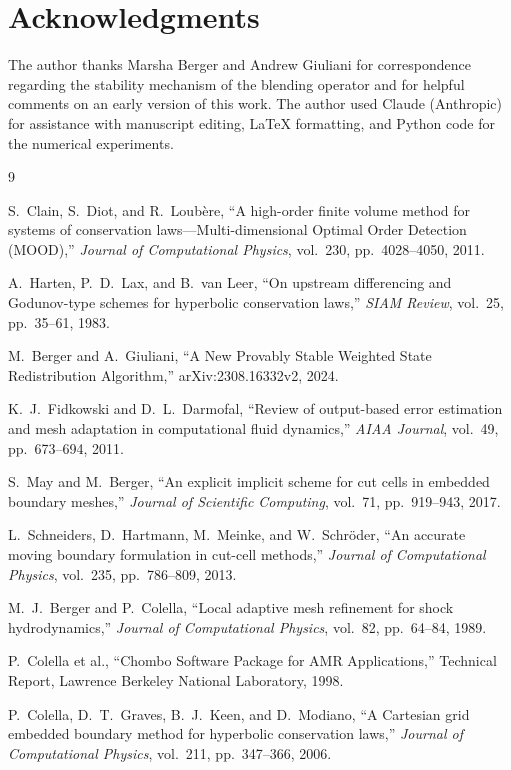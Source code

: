 \documentclass[11pt]{article}
\begin{document}
\section*{Acknowledgments}

The author thanks Marsha Berger and Andrew Giuliani for correspondence
regarding the stability mechanism of the blending operator and for
helpful comments on an early version of this work. The author used Claude (Anthropic) for assistance with manuscript 
editing, LaTeX formatting, and Python code for the numerical experiments.

\begin{thebibliography}{9}

S.~Clain, S.~Diot, and R.~Loub\`ere,
``A high-order finite volume method for systems of conservation laws---Multi-dimensional Optimal Order Detection (MOOD),''
\emph{Journal of Computational Physics}, vol.~230, pp.~4028--4050, 2011.

A.~Harten, P.~D.~Lax, and B.~van Leer,
``On upstream differencing and Godunov-type schemes for hyperbolic conservation laws,''
\emph{SIAM Review}, vol.~25, pp.~35--61, 1983.

M.~Berger and A.~Giuliani,
``A New Provably Stable Weighted State Redistribution Algorithm,''
arXiv:2308.16332v2, 2024.

K.~J.~Fidkowski and D.~L.~Darmofal,
``Review of output-based error estimation and mesh adaptation in computational 
fluid dynamics,''
\emph{AIAA Journal}, vol.~49, pp.~673--694, 2011.

S.~May and M.~Berger,
``An explicit implicit scheme for cut cells in embedded boundary meshes,''
\emph{Journal of Scientific Computing}, vol.~71, pp.~919--943, 2017.

L.~Schneiders, D.~Hartmann, M.~Meinke, and W.~Schr\"{o}der,
``An accurate moving boundary formulation in cut-cell methods,''
\emph{Journal of Computational Physics}, vol.~235, pp.~786--809, 2013.

M.~J.~Berger and P.~Colella,
``Local adaptive mesh refinement for shock hydrodynamics,''
\emph{Journal of Computational Physics}, vol.~82, pp.~64--84, 1989.

P.~Colella et al.,
``Chombo Software Package for AMR Applications,''
Technical Report, Lawrence Berkeley National Laboratory, 1998.

P.~Colella, D.~T.~Graves, B.~J.~Keen, and D.~Modiano,
``A Cartesian grid embedded boundary method for hyperbolic conservation laws,''
\emph{Journal of Computational Physics}, vol.~211, pp.~347--366, 2006.


\end{thebibliography}
\end{document}
